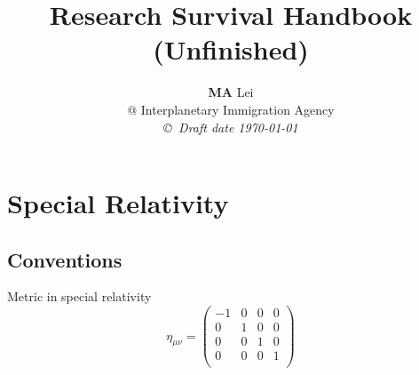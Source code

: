 \documentclass[12pt,a4paper]{book}
\begin{document}
\title{Research Survival Handbook \\ (\textbf{Unfinished})}
\author{{\bf MA} Lei  \\
@ Interplanetary Immigration Agency \\
{\small\em \copyright \ Draft date \today}}
\date{}
\maketitle


\newcommand{\dd}{\mathrm d}
\newenvironment{eqnset}
{\begin{equation}\left \bracevert \begin{array}{l}}
{\end{array} \right. \end{equation}}

\newenvironment{eqn}
{\begin{equation}\left \bracevert \begin{array}{l}}
{\end{array} \right. \end{equation}}





















\chapter{Special Relativity}





\section{Conventions}

Metric in special relativity
\begin{equation}\eta_{\mu\nu}=\left(\begin{matrix}
	-1 & 0 & 0 & 0\\
	0 & 1 & 0 & 0\\
	0 & 0 & 1 & 0\\
	0 & 0 & 0 & 1\\
\end{matrix}\right)\end{equation}
\end{document}
